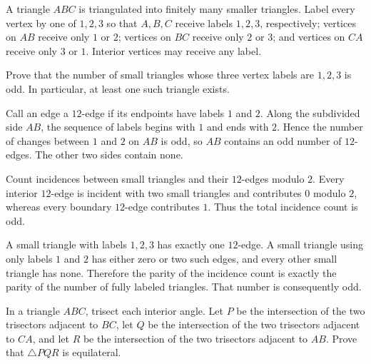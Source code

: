     \begin{expectedproblem}
        A triangle $ABC$ is triangulated into finitely many smaller triangles.
        Label every vertex by one of $1,2,3$ so that $A,B,C$ receive labels
        $1,2,3$, respectively; vertices on $AB$ receive only $1$ or $2$;
        vertices on $BC$ receive only $2$ or $3$; and vertices on $CA$ receive
        only $3$ or $1$. Interior vertices may receive any label.

        Prove that the number of small triangles whose three vertex labels are
        $1,2,3$ is odd. In particular, at least one such triangle exists.
    \end{expectedproblem}

    \begin{solution}
        Call an edge a $12$-edge if its endpoints have labels $1$ and $2$.
        Along the subdivided side $AB$, the sequence of labels begins with $1$
        and ends with $2$. Hence the number of changes between $1$ and $2$ on
        $AB$ is odd, so $AB$ contains an odd number of $12$-edges. The other
        two sides contain none.

        Count incidences between small triangles and their $12$-edges modulo
        $2$. Every interior $12$-edge is incident with two small triangles and
        contributes $0$ modulo $2$, whereas every boundary $12$-edge contributes
        $1$. Thus the total incidence count is odd.

        A small triangle with labels $1,2,3$ has exactly one $12$-edge. A small
        triangle using only labels $1$ and $2$ has either zero or two such
        edges, and every other small triangle has none. Therefore the parity of
        the incidence count is exactly the parity of the number of fully
        labeled triangles. That number is consequently odd.
    \end{solution}

    \begin{expectedproblem}
        In a triangle $ABC$, trisect each interior angle. Let $P$ be the
        intersection of the two trisectors adjacent to $BC$, let $Q$ be the
        intersection of the two trisectors adjacent to $CA$, and let $R$ be the
        intersection of the two trisectors adjacent to $AB$. Prove that
        $\triangle PQR$ is equilateral.
    \end{expectedproblem}


